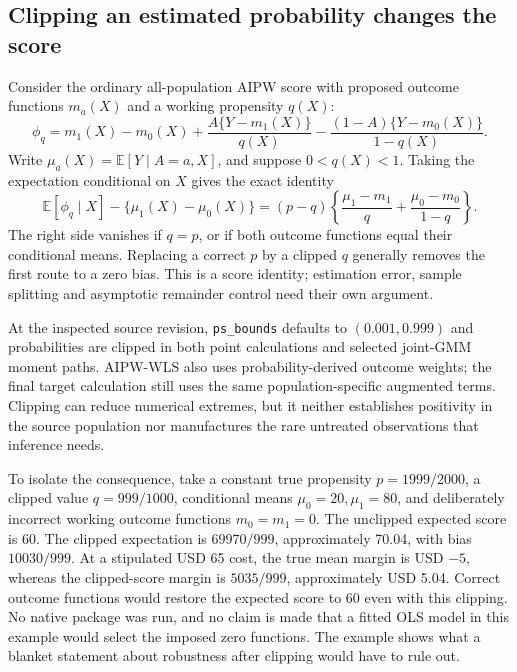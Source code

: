 \subsection{Clipping an estimated probability changes the score}
\label{exec20:pyfx-clipping}
Consider the ordinary all-population AIPW score with proposed outcome
functions $m_a(X)$ and a working propensity $q(X)$:
\begin{equation}
 \phi_q=m_1(X)-m_0(X)+\frac{A\{Y-m_1(X)\}}{q(X)}
       -\frac{(1-A)\{Y-m_0(X)\}}{1-q(X)}.
 \label{exec20:pyfx-score}
\end{equation}
Write $\mu_a(X)=\mathbb E[Y\mid A=a,X]$, and suppose $0<q(X)<1$.
Taking the expectation conditional on $X$ gives the exact identity
\begin{equation}
 \mathbb E[\phi_q\mid X]-\{\mu_1(X)-\mu_0(X)\}
 =(p-q)\left\{\frac{\mu_1-m_1}{q}
                 +\frac{\mu_0-m_0}{1-q}\right\}.
 \label{exec20:pyfx-bias}
\end{equation}
The right side vanishes if $q=p$, or if both outcome functions equal their
conditional means. Replacing a correct $p$ by a clipped $q$ generally removes
the first route to a zero bias. This is a score identity; estimation error,
sample splitting and asymptotic remainder control need their own argument.

At the inspected source revision, \texttt{ps\_bounds} defaults to
$(0.001,0.999)$ and probabilities are clipped in both point calculations
and selected joint-GMM moment paths. AIPW-WLS also uses probability-derived
outcome weights; the final target calculation still uses the same
population-specific augmented terms. Clipping can reduce numerical
extremes, but it neither establishes positivity in the source population
nor manufactures the rare untreated observations that inference needs.
\citep{exec20_python_effect_source}

To isolate the consequence, take a constant true propensity
$p=1999/2000$, a clipped value $q=999/1000$, conditional means
$\mu_0=20,\mu_1=80$, and deliberately incorrect working outcome functions
$m_0=m_1=0$. The unclipped expected score is 60. The clipped expectation
is $69970/999$, approximately 70.04, with bias $10030/999$.
At a stipulated USD 65 cost, the true mean margin is USD $-5$, whereas
the clipped-score margin is $5035/999$, approximately USD 5.04. Correct
outcome functions would restore the expected score to 60 even with this
clipping. No native package was run, and no claim is made that a fitted
OLS model in this example would select the imposed zero functions.
The example shows what a blanket statement about robustness after clipping
would have to rule out.\citep{exec20_python_effect_reference}

